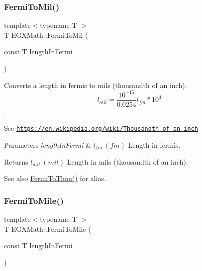 \subsubsection{\texorpdfstring{Fermi\+To\+Mil()}{FermiToMil()}}
{\footnotesize\ttfamily template$<$typename T $>$ \\
T E\+G\+X\+Math\+::\+Fermi\+To\+Mil (\begin{DoxyParamCaption}\item[{const T}]{length\+In\+Fermi }\end{DoxyParamCaption})}



Converts a length in fermis to mils (thousandth of an inch). \[ l_{mil}= \frac{10^{-15}}{0.0254} l_{fm} * 10^{3} \]. 

See \href{https://en.wikipedia.org/wiki/Thousandth_of_an_inch}{\tt https\+://en.\+wikipedia.\+org/wiki/\+Thousandth\+\_\+of\+\_\+an\+\_\+inch} 
\begin{DoxyParams}{Parameters}
{\em length\+In\+Fermi} & $ l_{fm}\ (fm)$ Length in fermis. \\
\hline
\end{DoxyParams}
\begin{DoxyReturn}{Returns}
$ l_{mil}\ (mil)$ Length in mils (thousandth of an inch). 
\end{DoxyReturn}
\begin{DoxySeeAlso}{See also}
\mbox{\hyperlink{group___e_g_x_math-_conversions-_length_conversions-_non-_s_i-_fermi-_imperial_ga370507ab066f38bc761a2ecd2b55c670}{Fermi\+To\+Thou()}} for alias. 
\end{DoxySeeAlso}
\mbox{\label{group___e_g_x_math-_conversions-_length_conversions-_non-_s_i-_fermi-_imperial_gaf74233f6bd05bd9a63a486813d3b4bf8}} 
\subsubsection{\texorpdfstring{Fermi\+To\+Mile()}{FermiToMile()}}
{\footnotesize\ttfamily template$<$typename T $>$ \\
T E\+G\+X\+Math\+::\+Fermi\+To\+Mile (\begin{DoxyParamCaption}\item[{const T}]{length\+In\+Fermi }\end{DoxyParamCaption})}



